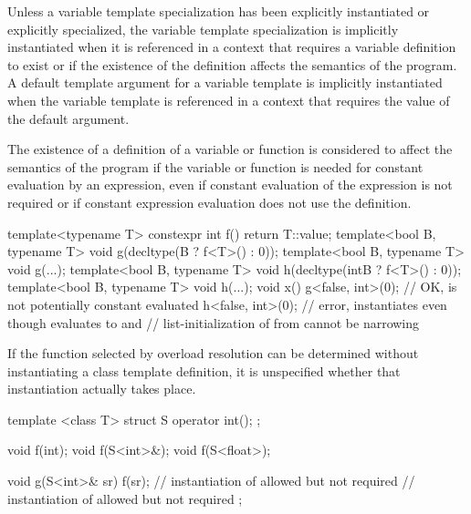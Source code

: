 \pnum
Unless a variable template specialization has been explicitly instantiated or
explicitly specialized,
the variable template specialization is implicitly instantiated
when it is referenced in a context
that requires a variable definition to exist or
if the existence of the definition affects the semantics of the program.
A default template argument for a variable template is implicitly instantiated
when the variable template is referenced in a context
that requires the value of the default argument.

\pnum
{}%
%
%
%
The existence of a definition of a variable or function
is considered to affect the semantics of the program
if the variable or function
is needed for constant evaluation by an expression,
even if constant evaluation of the expression is not required or
if constant expression evaluation does not use the definition.

\begin{example}
\begin{codeblock}
template<typename T> constexpr int f() { return T::value; }
template<bool B, typename T> void g(decltype(B ? f<T>() : 0));
template<bool B, typename T> void g(...);
template<bool B, typename T> void h(decltype(int{B ? f<T>() : 0}));
template<bool B, typename T> void h(...);
void x() {
  g<false, int>(0); // OK,  is not potentially constant evaluated
  h<false, int>(0); // error, instantiates  even though  evaluates to  and
                    // list-initialization of  from  cannot be narrowing
}
\end{codeblock}
\end{example}

\pnum
If the function selected by overload resolution
can be determined without instantiating a class template definition,
it is unspecified whether that instantiation actually takes place.
\begin{example}

\begin{codeblock}
template <class T> struct S {
  operator int();
};

void f(int);
void f(S<int>&);
void f(S<float>);

void g(S<int>& sr) {
  f(sr);            // instantiation of  allowed but not required
                    // instantiation of  allowed but not required
};
\end{codeblock}
\end{example}


